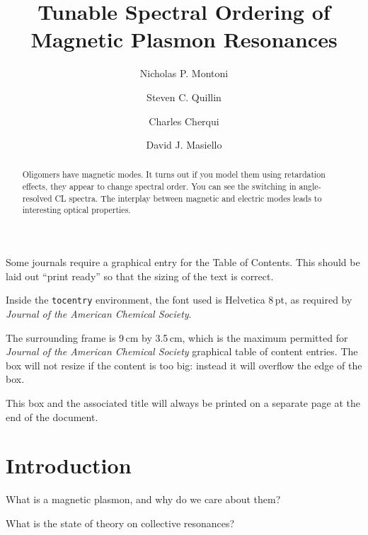 \documentclass[journal=apchd5,manuscript=article]{achemso}
\author{Nicholas P. Montoni}
\author{Steven C. Quillin}
\author{Charles Cherqui}
\affiliation[Department of Chemistry, University of Washington]
{Department of Chemistry, University of Washington, Seattle, WA 98195}
\author{David J. Masiello}
\affiliation[Department of Chemistry, University of Washington]
{Department of Chemistry, University of Washington, Seattle, WA 98195}
\title[]
    {Tunable Spectral Ordering of Magnetic Plasmon Resonances}
\begin{document}
\begin{tocentry}

Some journals require a graphical entry for the Table of Contents.
This should be laid out ``print ready'' so that the sizing of the
text is correct.

Inside the \texttt{tocentry} environment, the font used is Helvetica
8\,pt, as required by \emph{Journal of the American Chemical
Society}.

The surrounding frame is 9\,cm by 3.5\,cm, which is the maximum
permitted for  \emph{Journal of the American Chemical Society}
graphical table of content entries. The box will not resize if the
content is too big: instead it will overflow the edge of the box.

This box and the associated title will always be printed on a
separate page at the end of the document.

\end{tocentry}

\begin{abstract}
Oligomers have magnetic modes. It turns out if you model them using retardation effects, they appear to change spectral order. You can see the switching in angle-resolved CL spectra. The interplay between magnetic and electric modes leads to interesting optical properties.
\end{abstract}

\section{Introduction}

What is a magnetic plasmon, and why do we care about them?

What is the state of theory on collective resonances?
\end{document}
